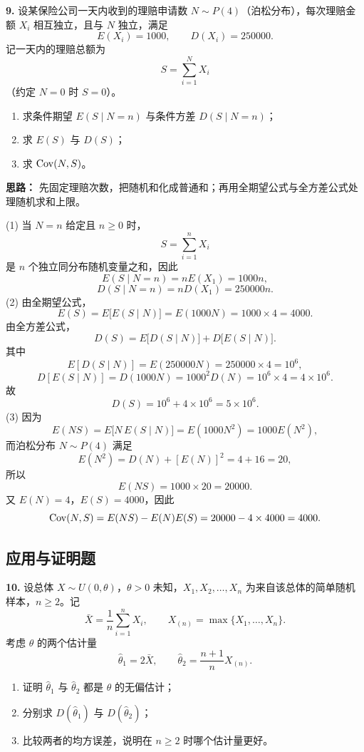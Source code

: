 
\else \answerarea[8] \fi%

\textbf{9.} 设某保险公司一天内收到的理赔申请数 $N\sim P(4)$（泊松分布），每次理赔金额 $X_i$ 相互独立，且与 $N$ 独立，满足
\[
E(X_i)=1000,\qquad D(X_i)=250000.
\]
记一天内的理赔总额为
\[
S=\sum_{i=1}^{N}X_i
\]
（约定 $N=0$ 时 $S=0$）。
\begin{enumerate}
    \item[(1)] 求条件期望 $E(S\mid N=n)$ 与条件方差 $D(S\mid N=n)$；
    \item[(2)] 求 $E(S)$ 与 $D(S)$；
    \item[(3)] 求 $\operatorname{Cov}(N,S)$。
\end{enumerate}

\ifshowsolutions%
\textbf{思路：} 先固定理赔次数，把随机和化成普通和；再用全期望公式与全方差公式处理随机求和上限。

(1) 当 $N=n$ 给定且 $n\geq0$ 时，
\[
S=\sum_{i=1}^{n}X_i
\]
是 $n$ 个独立同分布随机变量之和，因此
\[
E(S\mid N=n)=nE(X_1)=1000n,
\]
\[
D(S\mid N=n)=nD(X_1)=250000n.
\]
(2) 由全期望公式，
\[
E(S)=E\bigl[E(S\mid N)\bigr]=E(1000N)=1000\times4=4000.
\]
由全方差公式，
\[
D(S)=E\bigl[D(S\mid N)\bigr]+D\bigl[E(S\mid N)\bigr].
\]
其中
\[
E[D(S\mid N)]=E(250000N)=250000\times4=10^6,
\]
\[
D[E(S\mid N)]=D(1000N)=1000^2D(N)=10^6\times4=4\times10^6.
\]
故
\[
D(S)=10^6+4\times10^6=5\times10^6.
\]
(3) 因为
\[
E(NS)=E\bigl[N\,E(S\mid N)\bigr]=E(1000N^2)=1000E(N^2),
\]
而泊松分布 $N\sim P(4)$ 满足
\[
E(N^2)=D(N)+[E(N)]^2=4+16=20,
\]
所以
\[
E(NS)=1000\times20=20000.
\]
又 $E(N)=4$，$E(S)=4000$，因此
\[
\operatorname{Cov}(N,S)=E(NS)-E(N)E(S)=20000-4\times4000=4000.
\]

\else \answerarea[8] \fi%

\subsection{应用与证明题}

\textbf{10.} 设总体 $X\sim U(0,\theta)$，$\theta>0$ 未知，$X_1,X_2,\ldots,X_n$ 为来自该总体的简单随机样本，$n\geq2$。记
\[
\bar X=\frac1n\sum_{i=1}^{n}X_i,\qquad X_{(n)}=\max\{X_1,\ldots,X_n\}.
\]
考虑 $\theta$ 的两个估计量
\[
\hat\theta_1=2\bar X,\qquad \hat\theta_2=\frac{n+1}{n}X_{(n)}.
\]
\begin{enumerate}
    \item[(1)] 证明 $\hat\theta_1$ 与 $\hat\theta_2$ 都是 $\theta$ 的无偏估计；
    \item[(2)] 分别求 $D(\hat\theta_1)$ 与 $D(\hat\theta_2)$；
    \item[(3)] 比较两者的均方误差，说明在 $n\geq2$ 时哪个估计量更好。
\end{enumerate}

